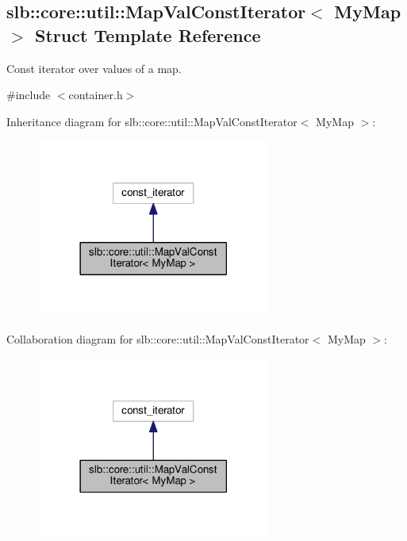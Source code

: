 \hypertarget{structslb_1_1core_1_1util_1_1MapValConstIterator}{}\subsection{slb\+:\+:core\+:\+:util\+:\+:Map\+Val\+Const\+Iterator$<$ My\+Map $>$ Struct Template Reference}
\label{structslb_1_1core_1_1util_1_1MapValConstIterator}


Const iterator over values of a map.  




{\ttfamily \#include $<$container.\+h$>$}



Inheritance diagram for slb\+:\+:core\+:\+:util\+:\+:Map\+Val\+Const\+Iterator$<$ My\+Map $>$\+:\nopagebreak
\begin{figure}[H]
\begin{center}
\leavevmode
\includegraphics[width=218pt]{structslb_1_1core_1_1util_1_1MapValConstIterator__inherit__graph}
\end{center}
\end{figure}


Collaboration diagram for slb\+:\+:core\+:\+:util\+:\+:Map\+Val\+Const\+Iterator$<$ My\+Map $>$\+:\nopagebreak
\begin{figure}[H]
\begin{center}
\leavevmode
\includegraphics[width=218pt]{structslb_1_1core_1_1util_1_1MapValConstIterator__coll__graph}
\end{center}
\end{figure}
